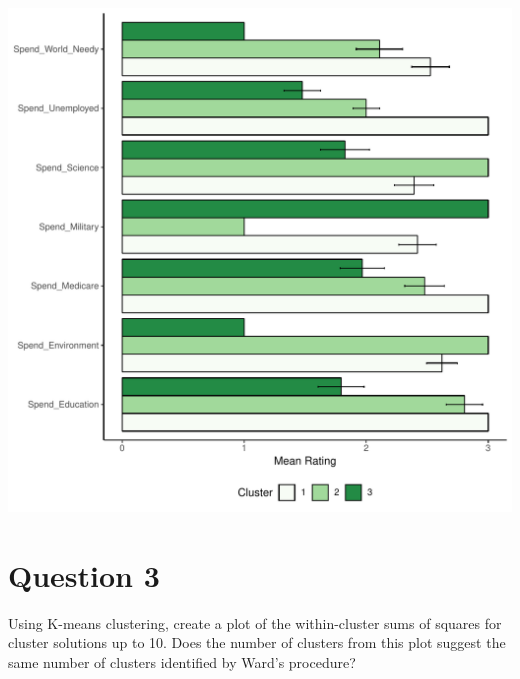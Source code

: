 \documentclass{article}\usepackage[]{graphicx}\usepackage[]{color}
\makeatletter
\def\maxwidth{ %
  \ifdim\Gin@nat@width>\linewidth
    \linewidth
  \else
    \Gin@nat@width
  \fi
}
\newenvironment{knitrout}{}{} %
\makeatother
\begin{document}
\begin{knitrout}
\includegraphics[width=\maxwidth]{figure/unnamed-chunk-6-1} 

\end{knitrout}

\section{Question 3}
Using K-means clustering, create a plot of the within-cluster sums of squares for cluster solutions up to 10. Does the number of clusters from this plot suggest the same number of clusters identified by Ward’s procedure?
\end{document}

